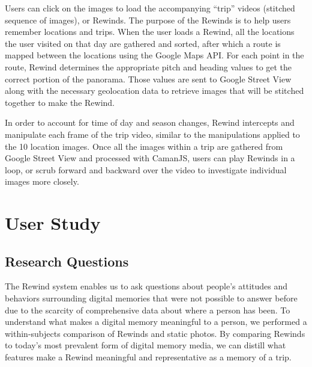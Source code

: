 \documentclass{sigchi}
\begin{document}
Users can click on the images to load the accompanying ``trip'' videos (stitched sequence of images), or Rewinds. The purpose of the Rewinds is to help users remember locations and trips.
When the user loads a Rewind, all the locations the user visited on that day are gathered and sorted, after which a route is mapped between the locations using the Google Maps API.
For each point in the route, Rewind determines the appropriate pitch and heading values to get the correct portion of the panorama. Those values are sent to Google Street View along with the necessary geolocation data to retrieve images that will be stitched together to make the Rewind.

In order to account for time of day and season changes,
Rewind intercepts and manipulate each frame of the trip video, similar to the manipulations applied to the 10 location images. Once all the images within a trip are gathered from Google Street View and processed with CamanJS, users can play Rewinds in a loop, or scrub forward and backward over the video to investigate individual images more closely.

\section{User Study}
\subsection{Research Questions}
The Rewind system enables us to ask questions about people's attitudes and behaviors surrounding digital memories that were not possible to answer before due to the scarcity of comprehensive data about where a person has been. To understand what makes a digital memory meaningful to a person, we performed a within-subjects comparison of Rewinds and static photos. By comparing Rewinds to today's most prevalent form of digital memory media, we can distill what features make a Rewind meaningful and representative as a memory of a trip.
\end{document}
